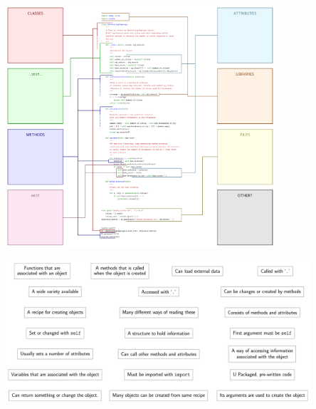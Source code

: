 \documentclass[a3paper, landscape]{article}
\begin{document}
\begin{center}

\vspace*{\fill}

\includegraphics[width=0.75\textwidth]{../assets/concepts2-diagram-blank}

\vspace*{\fill}

\end{center}

\newpage

\begin{center}

\vspace*{\fill}

\includegraphics[width=0.85\textwidth]{../assets/concepts2-diagram-sentences}

\vspace*{\fill}

\end{center}
\end{document}

